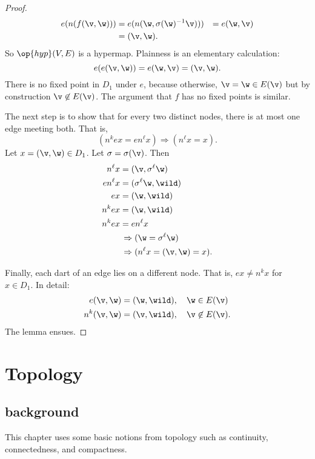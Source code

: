 \begin{proof}  
\begin{align*}
e(n(f(\v,\w))) &= e(n(\w,\sigma(\w)^{-1} \v))) &=
e(\w,\v)\\ 
&= (\v,\w).
\end{align*}
So $\op{hyp}(V,E)$ is a hypermap. 
Plainness is an elementary calculation:
\[ e(e(\v,\w)) = e(\w,\v) = (\v,\w).\] 
There is no fixed point in $D_1$ under $e$, because otherwise, $\v = \w\in E(\v)$
but by construction $\v\not\in E(\v)$.  The argument that $f$ has no
fixed points is similar.

The next step is to show that for every two distinct nodes, there
is at most one edge meeting both.  That is,
\[ (n^k e x = e n^\ell x)\Rightarrow (n^\ell x =
x).\]  Let $x = (\v,\w)\in D_1$.  Let
$\sigma=\sigma(\v)$. Then
\begin{align*}
n^\ell x &= (\v,\sigma^\ell \w)\\
e n^\ell x &= (\sigma^\ell \w,\wild )\\
e x &= (\w,\wild )\\
n^k e x &= (\w,\wild )\\
n^k e x &= e n^\ell x \\&\,\Rightarrow (\w = \sigma^\ell \w) \\&\,\Rightarrow
(n^\ell x = (\v,\w) = x).
\end{align*}

Finally,  each dart of an edge lies on a different node.
That is, $e x \ne n^k x$ for $x\in D_1$.   In detail:
\begin{align*}
e(\v,\w) &= (\w,\wild ),\quad \w\in E(\v)\\
n^k(\v,\w) &= (\v,\wild ),\quad \v\not\in E(\v).
\end{align*}
The lemma ensues.
\end{proof}

\section{Topology}\label{sec:topology}

\subsection{background}

This chapter uses some basic
notions from topology such as continuity, connectedness, and compactness.

